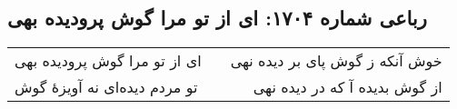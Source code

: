 \begin{center}
\section*{رباعی شماره ۱۷۰۴: ای از تو مرا گوش پرودیده بهی}
\label{sec:1704}
\begin{longtable}{l p{0.5cm} r}
ای از تو مرا گوش پرودیده بهی
&&
خوش آنکه ز گوش پای بر دیده نهی
\\
تو مردم دیده‌ای نه آویزهٔ گوش
&&
از گوش بدیده آ که در دیده نهی
\\
\end{longtable}
\end{center}
